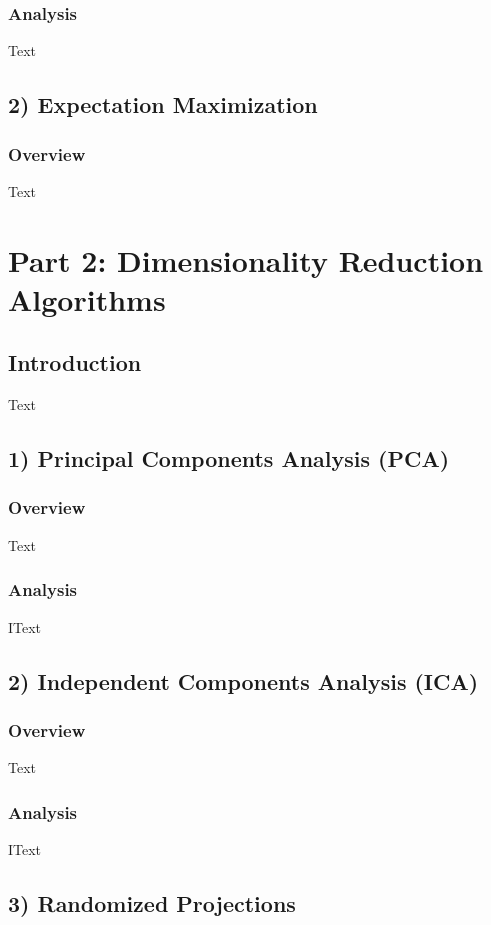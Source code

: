 \documentclass[h]{article}
\begin{document}
\subsubsection*{Analysis}
Text

\subsection*{2) Expectation Maximization}  
\subsubsection*{Overview}
Text


 
\section*{Part 2: Dimensionality Reduction Algorithms}
\subsection*{ Introduction}  
Text

\subsection*{1) Principal Components Analysis (PCA)}  
\subsubsection*{Overview}
Text

\subsubsection*{Analysis}
IText

\subsection*{2) Independent Components Analysis (ICA)}  
\subsubsection*{Overview}
Text

\subsubsection*{Analysis}
IText

\subsection*{3) Randomized Projections}  
\end{document}
